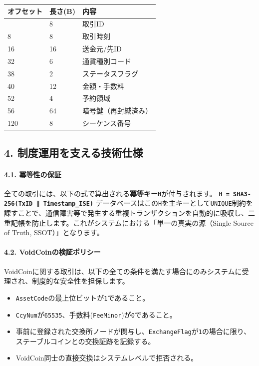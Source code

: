 \documentclass[
  a4paper,
  ja=standard,
  xelatex]{bxjsarticle}
\begin{document}
\begin{longtable}[]{@{}lll@{}}
\toprule\noalign{}
オフセット & 長さ(B) & 内容 \\
\midrule\noalign{}
\endhead
\bottomrule\noalign{}
\endlastfoot
0 & 8 & 取引ID \\
8 & 8 & 取引時刻 \\
16 & 16 & 送金元/先ID \\
32 & 6 & 通貨種別コード \\
38 & 2 & ステータスフラグ \\
40 & 12 & 金額・手数料 \\
52 & 4 & 予約領域 \\
56 & 64 & 暗号鍵（再封緘済み） \\
120 & 8 & シーケンス番号 \\
\end{longtable}

\subsection{\texorpdfstring{\textbf{4.
制度運用を支える技術仕様}}{4. 制度運用を支える技術仕様}}\label{ux5236ux5ea6ux904bux7528ux3092ux652fux3048ux308bux6280ux8853ux4ed5ux69d8}

\paragraph{\texorpdfstring{\textbf{4.1.
冪等性の保証}}{4.1. 冪等性の保証}}\label{ux51aaux7b49ux6027ux306eux4fddux8a3c}

全ての取引には、以下の式で算出される\textbf{冪等キー\texttt{H}}が付与されます。
\textbf{\texttt{H\ =\ SHA3-256(TxID\ ‖\ Timestamp\_ISE)}}
データベースはこの\texttt{H}を主キーとして\texttt{UNIQUE}制約を課すことで、通信障害等で発生する重複トランザクションを自動的に吸収し、二重記帳を防止します。これがシステムにおける「単一の真実の源（Single
Source of Truth, SSOT）」となります。

\paragraph{\texorpdfstring{\textbf{4.2.
VoidCoinの検証ポリシー}}{4.2. VoidCoinの検証ポリシー}}\label{voidcoinux306eux691cux8a3cux30ddux30eaux30b7ux30fc}

VoidCoinに関する取引は、以下の全ての条件を満たす場合にのみシステムに受理され、制度的な安全性を担保します。

\begin{itemize}
\item
  \texttt{AssetCode}の最上位ビットが\texttt{1}であること。
\item
  \texttt{CcyNum}が\texttt{65535}、手数料(\texttt{FeeMinor})が\texttt{0}であること。
\item
  事前に登録された交換所ノードが関与し、\texttt{ExchangeFlag}が\texttt{1}の場合に限り、ステーブルコインとの交換証跡を記録する。
\item
  VoidCoin同士の直接交換はシステムレベルで拒否される。
\end{itemize}
\end{document}
